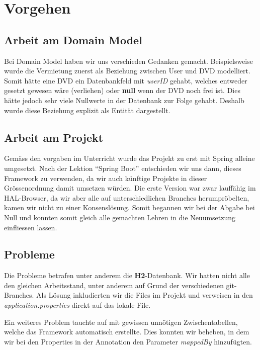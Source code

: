 \chapter{Vorgehen}
\label{chap:work}

\section{Arbeit am Domain Model}
Bei Domain Model haben wir uns verschieden Gedanken gemacht. Beispielsweise wurde die Vermietung zuerst als Beziehung zwischen User und DVD modelliert. Somit hätte eine DVD ein Datenbankfeld mit \emph{userID} gehabt, welches entweder gesetzt gewesen wäre (verliehen) oder \textbf{null} wenn der DVD noch frei ist. Dies hätte jedoch sehr viele Nullwerte in der Datenbank zur Folge gehabt. Deshalb wurde diese Beziehung explizit als Entität dargestellt.

\section{Arbeit am Projekt}
Gemäss den vorgaben im Unterricht wurde das Projekt zu erst mit Spring alleine umgesetzt. Nach der Lektion \enquote{Spring Boot} entschieden wir uns dann, dieses Framework zu verwenden, da wir auch künftige Projekte in dieser Grössenordnung damit umsetzen würden. Die erste Version war zwar lauffähig im HAL-Browser, da wir aber alle auf unterschiedlichen Branches herumpröbelten, kamen wir nicht zu einer Konsenslösung. Somit begannen wir bei der Abgabe bei Null und konnten somit gleich alle gemachten Lehren in die Neuumsetzung einfliessen lassen.


\section{Probleme}
Die Probleme betrafen unter anderem die \textbf{H2}-Datenbank. Wir hatten nicht alle den gleichen Arbeitsstand, unter anderem auf Grund der verschiedenen git-Branches. Als Lösung inkludierten wir die Files im Projekt und verweisen in den \emph{application.properties} direkt auf das lokale File.  

Ein weiteres Problem tauchte auf mit gewissen unnötigen Zwischentabellen, welche das Framework automatisch erstellte. Dies konnten wir beheben, in dem wir bei den Properties in der Annotation den Parameter \emph{mappedBy} hinzufügten.


